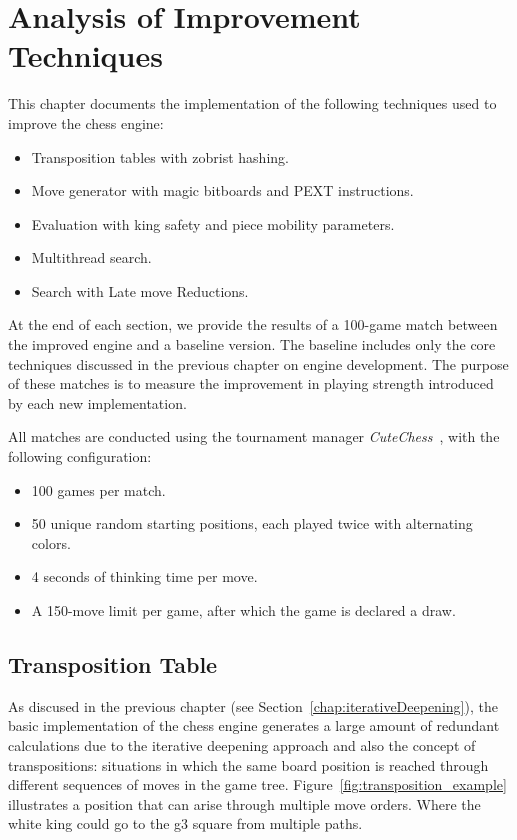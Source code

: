 \chapter{Analysis of Improvement Techniques}
\label{cap:analysisOfImprovements}

This chapter documents the implementation of the following techniques used to improve the chess engine:

\begin{itemize}
    \item Transposition tables with zobrist hashing.
    \item Move generator with magic bitboards and PEXT instructions.
    \item Evaluation with king safety and piece mobility parameters.
    \item Multithread search.
    \item Search with Late move Reductions.
\end{itemize}

\noindent At the end of each section, we provide the results of a 100-game match between the improved engine and a baseline version. The baseline includes only the core techniques discussed in the previous chapter on engine development. The purpose of these matches is to measure the improvement in playing strength introduced by each new implementation.

\vspace{1em}

\noindent All matches are conducted using the tournament manager \textit{CuteChess}~\cite{CuteChess}, with the following configuration:

\begin{itemize}
\item 100 games per match.
\item 50 unique random starting positions, each played twice with alternating colors.
\item 4 seconds of thinking time per move.
\item A 150-move limit per game, after which the game is declared a draw.
\end{itemize}

\newpage

\section{Transposition Table}
\label{sec:tt}

\noindent As discused in the previous chapter (see Section~\ref{chap:iterativeDeepening}), the basic implementation of the chess engine generates a large amount of redundant calculations due to the iterative deepening approach and also the concept of transpositions: situations in which the same board position is reached through different sequences of moves in the game tree.
\noindent Figure~\ref{fig:transposition_example} illustrates a position that can arise through multiple move orders. Where the white king could go to the g3 square from multiple paths.

